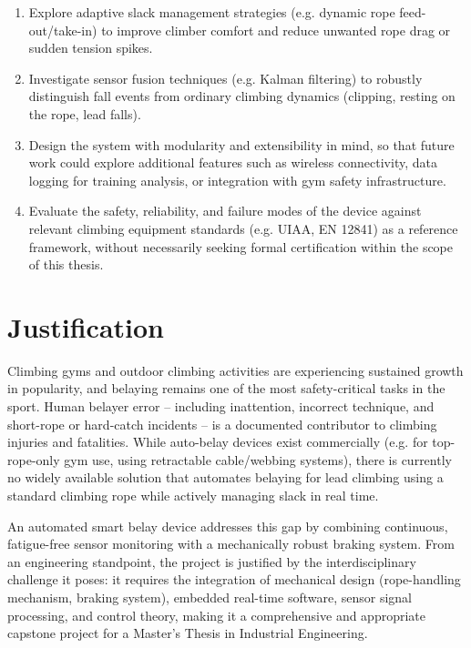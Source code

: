 \documentclass[11pt, a4paper]{article}
\begin{document}
\begin{enumerate}[leftmargin=1.2cm]
    \item Explore adaptive slack management strategies (e.g. dynamic rope
        feed-out/take-in) to improve climber comfort and reduce unwanted
        rope drag or sudden tension spikes.
    \item Investigate sensor fusion techniques (e.g. Kalman filtering)
        to robustly distinguish fall events from ordinary climbing
        dynamics (clipping, resting on the rope, lead falls).
    \item Design the system with modularity and extensibility in mind, so
        that future work could explore additional features such as
        wireless connectivity, data logging for training analysis, or
        integration with gym safety infrastructure.
    \item Evaluate the safety, reliability, and failure modes of the
        device against relevant climbing equipment standards (e.g. UIAA,
        EN 12841) as a reference framework, without necessarily seeking
        formal certification within the scope of this thesis.
\end{enumerate}

\section{Justification}

Climbing gyms and outdoor climbing activities are experiencing sustained
growth in popularity, and belaying remains one of the most safety-critical
tasks in the sport. Human belayer error -- including inattention, incorrect
technique, and short-rope or hard-catch incidents -- is a documented
contributor to climbing injuries and fatalities. While auto-belay devices
exist commercially (e.g. for top-rope-only gym use, using retractable
cable/webbing systems), there is currently no widely available solution
that automates belaying for lead climbing using a standard climbing rope
while actively managing slack in real time.

An automated smart belay device addresses this gap by combining
continuous, fatigue-free sensor monitoring with a mechanically robust
braking system. From an engineering standpoint, the project is justified
by the interdisciplinary challenge it poses: it requires the integration
of mechanical design (rope-handling mechanism, braking system), embedded
real-time software, sensor signal processing, and control theory, making
it a comprehensive and appropriate capstone project for a Master's Thesis
in Industrial Engineering.
\end{document}
